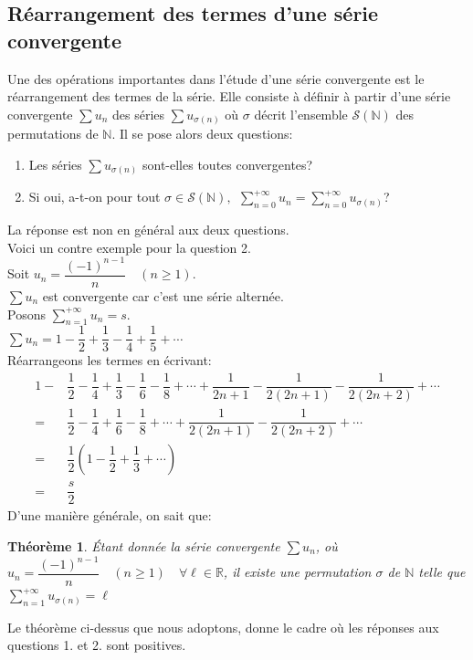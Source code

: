 \documentclass[11pt, a4paper]{book}
\newtheorem{teo}{Th\'eor\`eme}[section]
\begin{document}
\subsection*{R\'earrangement des termes d'une s\'erie convergente}
Une des op\'erations importantes dans l'\'etude d'une s\'erie convergente est le r\'earrangement des termes de la s\'erie. Elle consiste \`a d\'efinir \`a partir d'une s\'erie convergente $\sum u_n$ des s\'eries $\sum u_{\sigma(n)}$ o\`u $\sigma$ d\'ecrit l'ensemble $ \mathcal{S}(\mathbb{N})$ des permutations de $\mathbb{N}$. Il se pose alors deux questions: \begin{enumerate}
\item Les s\'eries $\sum u_{\sigma(n)}$ sont-elles toutes convergentes?
\item Si oui, a-t-on pour tout $\sigma \in \mathcal{S}(\mathbb{N}),~~{\displaystyle \sum_{n=0}^{+\infty}u_n=\sum_{n=0}^{+\infty}u_{\sigma(n)}}$?
\end{enumerate}
La r\'eponse est non en g\'en\'eral aux deux questions.\\Voici un contre exemple pour la question 2.\\
Soit $u_n=\dfrac{(-1)^{n-1}}{n}\quad(n\geq1)$.\\
$\sum u_n$ est convergente car c'est une s\'erie altern\'ee.\\
Posons ${\displaystyle\sum_{n=1}^{+\infty}u_n=s}$.\\
$\sum u_n=1-\dfrac{1}{2}+\dfrac{1}{3}-\dfrac{1}{4}+\dfrac{1}{5}+\cdots$ \\
R\'earrangeons les termes en \'ecrivant:
\begin{align*} 1-&\dfrac{1}{2}-\dfrac{1}{4}+\dfrac{1}{3}-\dfrac{1}{6}-\dfrac{1}{8}+\cdots+\dfrac{1}{2n+1}-\dfrac{1}{2(2n+1)}-\dfrac{1}{2(2n+2)}+\cdots\\
=& \dfrac{1}{2}-\dfrac{1}{4}+\dfrac{1}{6}-\dfrac{1}{8}+\cdots+\dfrac{1}{2(2n+1)}-\dfrac{1}{2(2n+2)}+\cdots\\
=&\dfrac{1}{2}\left( 1-\dfrac{1}{2}+\dfrac{1}{3}+\cdots \right)\\
=&\dfrac{s}{2} \end{align*}
D'une mani\`ere g\'en\'erale, on sait que:
\begin{teo} \'Etant donn\'ee la s\'erie convergente $\sum u_n$, o\`u $u_n=\dfrac{(-1)^{n-1}}{n} \quad(n\geq1)\quad\forall \ell\in \mathbb{R}$, il existe une permutation $\sigma$ de $ \mathbb{N}$ telle que ${\displaystyle \sum _{n=1}^{+\infty}u_{\sigma(n)}=\ell}$ 
\end{teo}
Le th\'eor\`eme ci-dessus que nous adoptons, donne le cadre o\`u les r\'eponses aux questions 1. et 2. sont positives.
\end{document}
